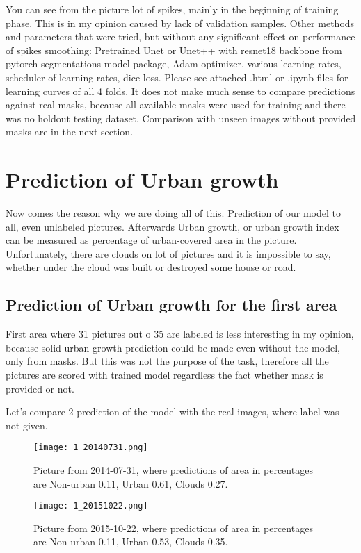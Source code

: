 \documentclass{homework}
\begin{document}
You can see from the picture lot of spikes, mainly in the beginning of training phase. This is in my opinion caused by lack of validation samples. Other methods and parameters that were tried, but without any significant effect on performance of spikes smoothing: Pretrained Unet or Unet++ with resnet18 backbone from pytorch segmentations model package, Adam optimizer, various learning rates, scheduler of learning rates, dice loss. Please see attached .html or .ipynb files for learning curves of all 4 folds. 
It does not make much sense to compare predictions against real masks, because all available masks were used for training and there was no holdout testing dataset. Comparison with unseen images without provided masks are in the next section.

\section{Prediction of Urban growth}
Now comes the reason why we are doing all of this. Prediction of our model to all, even unlabeled pictures. Afterwards Urban growth, or urban growth index can be measured as percentage of urban-covered area in the picture. Unfortunately, there are clouds on lot of pictures and it is impossible to say, whether under the cloud was built or destroyed some house or road.

\subsection{Prediction of Urban growth for the first area}
First area where 31 pictures out o 35 are labeled is less interesting in my opinion, because solid urban growth prediction could be made even without the model, only from masks. But this was not the purpose of the task, therefore all the pictures are scored with trained model regardless the fact whether mask is provided or not.

Let's compare 2 prediction of the model with the real images, where label was not given.

\begin{figure}[H]
\centering
\texttt{[image: 1\_20140731.png]}
\caption{Picture from 2014-07-31, where predictions of area in percentages are Non-urban 0.11, Urban 0.61, Clouds 0.27.}
\centering
\end{figure}

\begin{figure}[H]
\centering
\texttt{[image: 1\_20151022.png]}
\caption{Picture from 2015-10-22, where predictions of area in percentages are Non-urban 0.11, Urban 0.53, Clouds 0.35.}
\centering
\end{figure}
\end{document}
